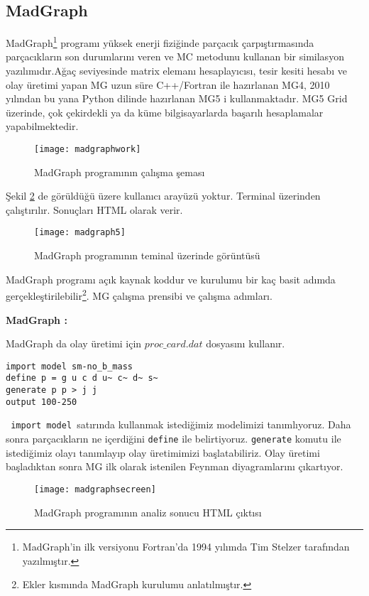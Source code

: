\subsection{MadGraph}
MadGraph\footnote{MadGraph'in ilk versiyonu Fortran'da 1994 yılımda  Tim Stelzer tarafından yazılmıştır.} programı yüksek enerji fiziğinde parçacık çarpıştırmasında parçacıkların son durumlarını veren ve MC metodunu kullanan bir similasyon yazılımıdır.Ağaç seviyesinde matrix elemanı hesaplayıcısı, tesir kesiti hesabı ve olay üretimi yapan MG uzun süre C++/Fortran ile hazırlanan MG4, 2010 yılından bu yana Python dilinde hazırlanan MG5 i kullanmaktadır. MG5 Grid üzerinde, çok çekirdekli ya da küme bilgisayarlarda başarılı hesaplamalar yapabilmektedir. 
\begin{figure}[!htpb]
\centering
	\texttt{[image: madgraphwork]}
	\caption{MadGraph programının çalışma şeması}
	\label{fig:mgwork}
\end{figure}

Şekil \ref{fig:mgterminal} de görüldüğü üzere kullanıcı arayüzü yoktur. Terminal üzerinden çalıştırılır. Sonuçları HTML olarak verir.


\begin{figure}[!htpb]
\centering
\texttt{[image: madgraph5]}
\caption{MadGraph programının teminal üzerinde görüntüsü}
\label{fig:mgterminal}
\end{figure}


MadGraph programı açık kaynak koddur ve kurulumu bir kaç basit adımda gerçekleştirilebilir\footnote{Ekler kısmında MadGraph kurulumu anlatılmıştır.}. MG çalışma prensibi ve çalışma adımları. 


\par \textbf{MadGraph : } 
\par MadGraph da olay üretimi için $proc\_card.dat$ dosyasını kullanır.

\begin{lstlisting}
import model sm-no_b_mass
define p = g u c d u~ c~ d~ s~
generate p p > j j
output 100-250
\end{lstlisting}
\texttt{ import model }satırında kullanmak istediğimiz modelimizi tanımlıyoruz. Daha sonra parçacıkların ne içerdiğini  \texttt{define} ile belirtiyoruz. \texttt{generate} komutu ile istediğimiz olayı tanımlayıp olay üretimimizi başlatabiliriz. Olay üretimi başladıktan sonra MG ilk olarak istenilen Feynman diyagramlarını çıkartıyor. 

\begin{figure}[!htpb]
\centering
\texttt{[image: madgraphsecreen]}
\caption{MadGraph programının analiz sonucu HTML çıktısı}
\label{fig:mgscreen}
\end{figure}

